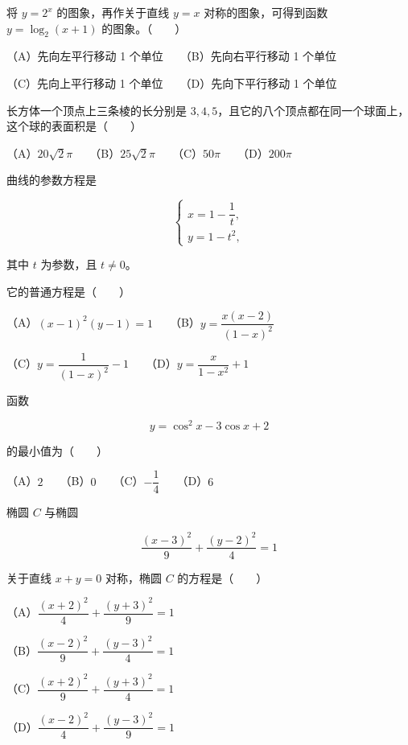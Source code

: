 \begin{question}
将 $y=2^x$ 的图象\gkblank{}，再作关于直线 $y=x$ 对称的图象，可得到函数 $y=\log_2(x+1)$ 的图象。\mbox{（　　）}

（A）先向左平行移动 1 个单位　　（B）先向右平行移动 1 个单位

（C）先向上平行移动 1 个单位　　（D）先向下平行移动 1 个单位

\end{question}
\begin{question}
长方体一个顶点上三条棱的长分别是 $3,4,5$，且它的八个顶点都在同一个球面上，这个球的表面积是\mbox{（　　）}

（A）$20\sqrt2\pi$　　（B）$25\sqrt2\pi$　　（C）$50\pi$　　（D）$200\pi$

\end{question}
\begin{question}
曲线的参数方程是

\nopagebreak[4]
\[
\begin{cases}
x=1-\dfrac1t,\\
y=1-t^2,
\end{cases}
\]

其中 $t$ 为参数，且 $t\neq0$。

它的普通方程是\mbox{（　　）}

（A）$(x-1)^2(y-1)=1$　　（B）$y=\dfrac{x(x-2)}{(1-x)^2}$

（C）$y=\dfrac1{(1-x)^2}-1$　　（D）$y=\dfrac{x}{1-x^2}+1$

\end{question}
\begin{question}
函数

\nopagebreak[4]
\[
y=\cos^2x-3\cos x+2
\]

的最小值为\mbox{（　　）}

（A）$2$　　（B）$0$　　（C）$-\dfrac14$　　（D）$6$

\end{question}
\begin{question}
椭圆 $C$ 与椭圆

\nopagebreak[4]
\[
\dfrac{(x-3)^2}{9}+\dfrac{(y-2)^2}{4}=1
\]

关于直线 $x+y=0$ 对称，椭圆 $C$ 的方程是\mbox{（　　）}

（A）$\dfrac{(x+2)^2}{4}+\dfrac{(y+3)^2}{9}=1$

（B）$\dfrac{(x-2)^2}{9}+\dfrac{(y-3)^2}{4}=1$

（C）$\dfrac{(x+2)^2}{9}+\dfrac{(y+3)^2}{4}=1$

（D）$\dfrac{(x-2)^2}{4}+\dfrac{(y-3)^2}{9}=1$

\end{question}

